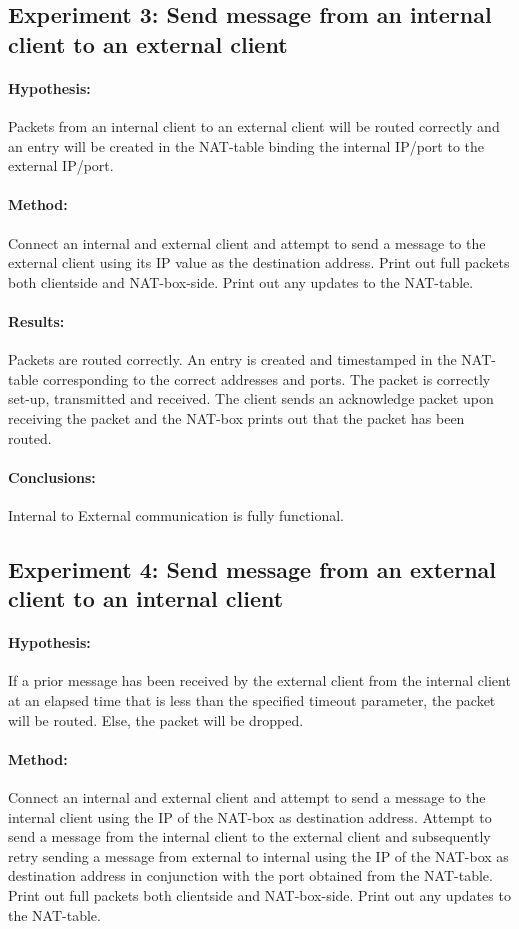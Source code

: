 \documentclass[12pt, a4paper]{article}
\begin{document}
\subsection{Experiment 3: Send message from an internal client to an external client}
\paragraph{Hypothesis:}
Packets from an internal client to an external client will be routed correctly and an entry will be created in the NAT-table binding the internal IP/port to the external IP/port.
\paragraph{Method:}
Connect an internal and external client and attempt to send a message to the external client using its IP value as the destination address. Print out full packets both clientside and NAT-box-side. Print out any updates to the NAT-table.
\paragraph{Results:}
Packets are routed correctly. An entry is created and timestamped in the NAT-table corresponding to the correct addresses and ports. The packet is correctly set-up, transmitted and received. The client sends an acknowledge packet upon receiving the packet and the NAT-box prints out that the packet has been routed.
\paragraph{Conclusions:}
Internal to External communication is fully functional.

\subsection{Experiment 4: Send message from an external client to an internal client}
\paragraph{Hypothesis:}
If a prior message has been received by the external client from the internal client at an elapsed time that is less than the specified timeout parameter, the packet will be routed. Else, the packet will be dropped.
\paragraph{Method:}
Connect an internal and external client and attempt to send a message to the internal client using the IP of the NAT-box as destination address. Attempt to send a message from the internal client to the external client and subsequently retry sending a message from external to internal using the IP of the NAT-box as destination address in conjunction with the port obtained from the NAT-table. Print out full packets both clientside and NAT-box-side. Print out any updates to the NAT-table.
\end{document}
